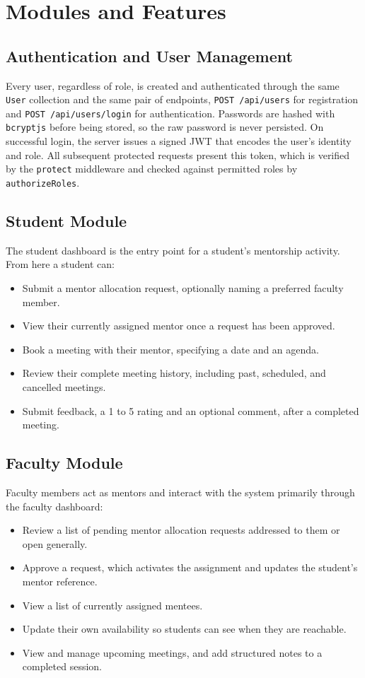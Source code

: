 \documentclass[12pt,a4paper]{report}
\newcommand{\sectionrule}{\vspace{-4pt}{\color{lightgray}\hrule height 1pt}\vspace{8pt}}
\begin{document}
\chapter{Modules and Features}

\section{Authentication and User Management}
\sectionrule
Every user, regardless of role, is created and authenticated through the same \texttt{User} collection and the same pair of endpoints, \texttt{POST /api/users} for registration and \texttt{POST /api/users/login} for authentication. Passwords are hashed with \texttt{bcryptjs} before being stored, so the raw password is never persisted. On successful login, the server issues a signed JWT that encodes the user's identity and role. All subsequent protected requests present this token, which is verified by the \texttt{protect} middleware and checked against permitted roles by \texttt{authorizeRoles}.

\section{Student Module}
\sectionrule
The student dashboard is the entry point for a student's mentorship activity. From here a student can:
\begin{itemize}[itemsep=2pt]
  \item Submit a mentor allocation request, optionally naming a preferred faculty member.
  \item View their currently assigned mentor once a request has been approved.
  \item Book a meeting with their mentor, specifying a date and an agenda.
  \item Review their complete meeting history, including past, scheduled, and cancelled meetings.
  \item Submit feedback, a 1 to 5 rating and an optional comment, after a completed meeting.
\end{itemize}

\section{Faculty Module}
\sectionrule
Faculty members act as mentors and interact with the system primarily through the faculty dashboard:
\begin{itemize}[itemsep=2pt]
  \item Review a list of pending mentor allocation requests addressed to them or open generally.
  \item Approve a request, which activates the assignment and updates the student's mentor reference.
  \item View a list of currently assigned mentees.
  \item Update their own availability so students can see when they are reachable.
  \item View and manage upcoming meetings, and add structured notes to a completed session.
\end{itemize}
\end{document}
